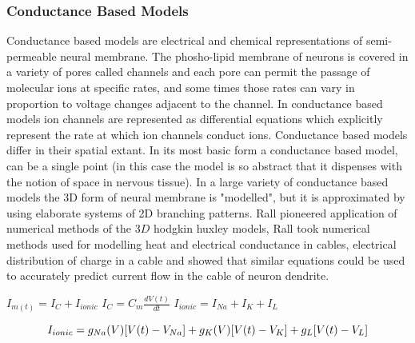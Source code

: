\subsubsection{Conductance Based Models}
Conductance based models are electrical and chemical representations of semi-permeable neural membrane.  The phosho-lipid membrane of neurons is covered in a variety of pores called channels and each pore can permit the passage of molecular ions at specific rates, and some times those rates can vary in proportion to voltage changes adjacent to the channel. In conductance based models ion channels are represented as differential equations which explicitly represent the rate at which ion channels conduct ions. Conductance based models differ in their spatial extant. In its most basic form a conductance based model, can be a single point (in this case the model is so abstract that it dispenses with the notion of space in nervous tissue). In a large variety of conductance based models the 3D form of neural membrane is "modelled", but it is approximated by using elaborate systems of 2D branching patterns. \cite{rall1962electrophysiology}  Rall pioneered application of numerical methods of the $3D$ hodgkin huxley models, Rall took numerical methods used for modelling heat and electrical conductance in cables, electrical distribution of charge in a cable and showed that similar equations could be used to accurately predict current flow in the cable of neuron dendrite.\\ %
\begin{center}
$ I_{m(t)}=I_{C}+I_{ionic} $
$I_{C}=C_{m}\frac{dV(t)}{dt} $
$I_{ionic}=I_{Na}+I_{K}+I_{L} $
\end{center}

\begin{equation}
I_{ionic}=\\
g_{Na}(V)[V(t)-V_{Na}]+\\
g_{K}(V)[V(t)-V_{K}]+\\g_{L}[V(t)-V_{L}] 
\end{equation}

